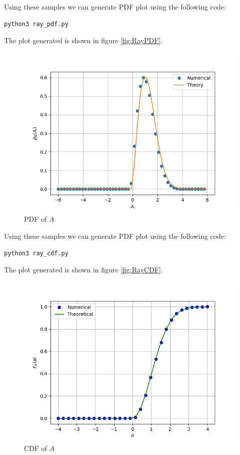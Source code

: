 \documentclass[journal,12pt,twocolumn]{IEEEtran}
\renewcommand\thesection{\arabic{section}}
\begin{document}
\begin{enumerate}[label=\thesection.\arabic*
,ref=\thesection.\theenumi]
	Using these samples we can generate PDF plot using the following code:
	\begin{lstlisting}
python3 ray_pdf.py
	\end{lstlisting}

	The plot generated is shown in figure \eqref{fig:RayPDF}.
	\begin{figure}
	\centering
	\includegraphics[width=\columnwidth]{../figs/ray_pdf.png}
	\caption{PDF of $A$}
	\label{fig:RayPDF}
	\end{figure}

	Using these samples we can generate PDF plot using the following code:
	\begin{lstlisting}
python3 ray_cdf.py
	\end{lstlisting}

	The plot generated is shown in figure \eqref{fig:RayCDF}.
	\begin{figure}
	\centering
	\includegraphics[width=\columnwidth]{../figs/ray_cdf.png}
	\caption{CDF of $A$}
	\label{fig:RayCDF}
	\end{figure}

\end{enumerate}
\end{document}
